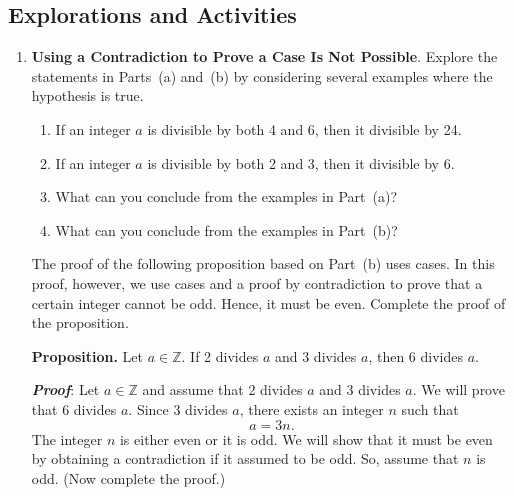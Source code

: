 \subsection*{Explorations and Activities}
\setcounter{oldenumi}{\theenumi}
\begin{enumerate} \setcounter{enumi}{\theoldenumi}
\item \textbf{Using a Contradiction to Prove a Case Is Not Possible}.  Explore the statements in Parts~(a) and~(b) 
by considering several examples where the hypothesis is true.
\label{exer:sec34-9}%

\begin{enumerate}
  \item If an integer  $a$  is divisible by both  4  and  6, then it divisible by  24.
\label{exer:sec35-9a}%

  \item If an integer  $a$  is divisible by both  2  and  3, then it divisible by  6.
\label{exer:sec35-9b}%

  \item What can you conclude from the examples in Part~(a)?

  \item What can you conclude from the examples in Part~(b)?

\end{enumerate}
%
The proof of the following proposition based on Part~(b) uses cases.  In this proof, however, we use cases and a proof by contradiction to prove that a certain integer cannot be odd.  Hence, it must be even.  Complete the proof of the proposition.

\textbf{Proposition.}
Let  $a \in \mathbb{Z}$.  If  2  divides  $a$  and  3  divides  $a$, then  6  divides  $a$.

\noindent
\textbf{\emph{Proof}}:  Let  $a \in \mathbb{Z}$ and assume that  2  divides  $a$  and  3  divides  $a$.  We will prove that  6 divides  $a$.  Since  3  divides  $a$, there exists an integer  $n$  such that
\[
a = 3n.
\]
The integer  $n$  is either even or it is odd.  We will show that it must be even by obtaining a contradiction if it assumed to be odd.  So, assume that  $n$  is odd.  (Now complete the proof.)


\end{enumerate}
